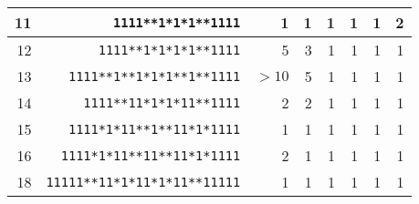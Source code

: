 \documentclass{llncs}
\begin{document}
\begin{table}[h!]
\begin{tabular}{|r|r|r|r|r|r|r|r|}
\hline
11 & \texttt{1111**1*1*1**1111} & 1 & 1 & 1 & 1 & 1 & 2 \\
\hline
12 & \texttt{1111**1*1*1*1**1111} & 5 & 3 & 1 & 1 & 1 & 1 \\
\hline
13 & \texttt{1111**1**1*1*1**1**1111} & $> 10$ & 5 & 1 & 1 & 1 & 1 \\
\hline
14 & \texttt{1111**11*1*1*11**1111} & 2 & 2 & 1 & 1 & 1 & 1 \\
\hline
15 & \texttt{1111*1*11**1**11*1*1111} & 1 & 1 & 1 & 1 & 1 & 1 \\
\hline
16 & \texttt{1111*1*11**11**11*1*1111} & 2 & 1 & 1 & 1 & 1 & 1 \\
\hline
18 & \texttt{11111**11*1*11*1*11**11111} & 1 & 1 & 1 & 1 & 1 & 1 \\

\end{tabular}
\end{table}
\end{document}
